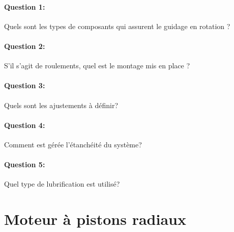 \paragraph{Question 1:} Quels sont les types de composants qui assurent le guidage en rotation ?

\paragraph{Question 2:} S'il s'agit de roulements, quel est le montage mis en place ?

\paragraph{Question 3:} Quels sont les ajustements à définir?

\paragraph{Question 4:} Comment est gérée l'étanchéité du système?

\paragraph{Question 5:} Quel type de lubrification est utilisé?



\newpage

\section{Moteur à pistons radiaux}

